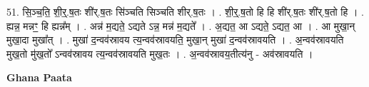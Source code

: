 \documentclass[17pt]{extarticle}
\begin{document}
51. सि॒ञ्च॒ति॒ शी॒र्॒.ष॒तः शी॑र्.ष॒तः सि॑ञ्चति सिञ्चति शीर्.ष॒तः । . शी॒र्॒.ष॒तो हि हि शी॑र्.ष॒तः शी॑र्.ष॒तो हि । . ह्यन्न॒ मन्नꣳ॒॒ हि ह्यन्न᳚म् । . अन्न॑ म॒द्यते॒ ऽद्यते ऽन्न॒ मन्न॑ म॒द्यते᳚ । . अ॒द्यत॒ आ ऽद्यते॒ ऽद्यत॒ आ । . आ मुखा॒न् मुखा॒दा मुखा᳚त् । . मुखा॑ द॒न्वव॑स्रावय त्य॒न्वव॑स्रावयति॒ मुखा॒न् मुखा॑ द॒न्वव॑स्रावयति । . अ॒न्वव॑स्रावयति मुख॒तो मु॑ख॒तो᳚ ऽन्वव॑स्रावय त्य॒न्वव॑स्रावयति मुख॒तः । . अ॒न्वव॑स्रावय॒तीत्य॑नु - अव॑स्रावयति । \newline

\textbf{Ghana Paata } \newline
\end{document}
